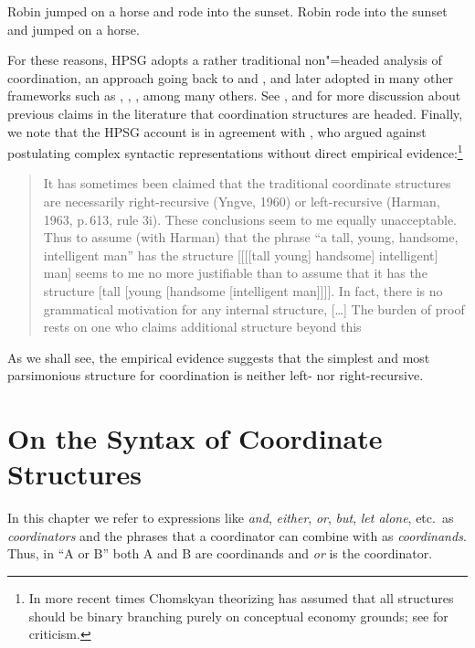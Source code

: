 \documentclass[output=paper
                ,modfonts
                ,nonflat
	        ,collection
	        ,collectionchapter
	        ,collectiontoclongg
 	        ,biblatex
                ,babelshorthands
                ,newtxmath
                ,draftmode
                ,colorlinks, citecolor=brown
]{./langsci/langscibook}
\begin{document}
{\begin{exe}
\ex
\begin{xlista}
\ex Robin jumped on a horse and rode into the sunset.
\ex Robin rode into the sunset and jumped on a horse.
\end{xlista}
\end{exe}

For these reasons, HPSG adopts a rather traditional non"=headed analysis of coordination, an approach  going back
to \citet[195]{bloom} and  \citet{ross67}, and later adopted in many other frameworks such as \citet{pesetsky}, \citet{gazdarc},  \citet[1275]{rodney}, among many others. 
See \citet{borsley94}, 
\citet{Borsley2005a} %
and 
\citet[Chaves 2]{chavesthesis} for more discussion about previous claims in the literature that coordination structures are headed.
Finally, we note that the HPSG account is in agreement with \citet[196]{chom65}, who argued against postulating complex syntactic representations without direct empirical evidence:\footnote{In more recent times Chomskyan theorizing has assumed that all structures should be binary branching purely on conceptual economy grounds; see \citet{Johnson:Lappin:99} for criticism.}

\begin{quote}
It has sometimes been claimed that the traditional coordinate structures are necessarily right-recursive (Yngve, 1960) or left-recursive (Harman, 1963, p.\,613, rule 3i). These conclusions seem to me equally unacceptable. Thus to assume (with Harman) that the phrase “a tall, young, handsome, intelligent man” has the structure [[[[tall young] handsome] intelligent] man] seems to me no more justifiable than to assume that it has
the structure [tall [young [handsome [intelligent man]]]]. In fact, there is no grammatical
motivation for any internal structure, [\ldots] The burden of proof rests on one who claims additional
structure beyond this \citep[196--197]{chom65}
\end{quote}

\noindent
As we shall see, the empirical evidence suggests that
the simplest and most parsimonious structure for coordination is neither left- nor right-recursive.


\section{On the Syntax of Coordinate Structures}

In this chapter we refer to expressions like \emph{and}, \emph{either},  \emph{or}, \emph{but}, 
\emph{let alone}, etc.\ as \emph{coordinators} and the phrases that a coordinator can combine with as  \emph{coordinands}.
Thus,  in ``A or B'' both A and B are coordinands and \emph{or} is the coordinator. 

}
\end{document}
